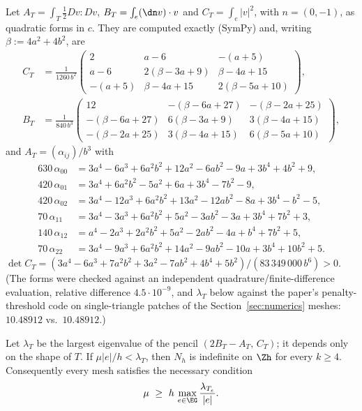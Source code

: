 Let $A_T=\int_T\frac12Dv:Dv$, $B_T=\int_e(\dn v)\cdot v$ and $C_T=\int_e|v|^2$, with $n=(0,-1)$, as quadratic forms in $c$. They are
computed exactly (SymPy) and, writing $\beta:=4a^2+4b^2$, are
\begin{align*}
C_T&=\frac1{1260\,b^2}\begin{pmatrix}2&a-6&-(a+5)\\ a-6&2(\beta-3a+9)&\beta-4a+15\\ -(a+5)&\beta-4a+15&2(\beta-5a+10)\end{pmatrix},\\
B_T&=\frac1{840\,b^3}\begin{pmatrix}12&-(\beta-6a+27)&-(\beta-2a+25)\\ -(\beta-6a+27)&6(\beta-3a+9)&3(\beta-4a+15)\\ -(\beta-2a+25)&3(\beta-4a+15)&6(\beta-5a+10)\end{pmatrix},
\end{align*}
and $A_T=(\alpha_{ij})/b^3$ with
\begin{align*}
630\,\alpha_{00}&=3a^4-6a^3+6a^2b^2+12a^2-6ab^2-9a+3b^4+4b^2+9,\\
420\,\alpha_{01}&=3a^4+6a^2b^2-5a^2+6a+3b^4-7b^2-9,\\
420\,\alpha_{02}&=3a^4-12a^3+6a^2b^2+13a^2-12ab^2-8a+3b^4-b^2-5,\\
70\,\alpha_{11}&=3a^4-3a^3+6a^2b^2+5a^2-3ab^2-3a+3b^4+7b^2+3,\\
140\,\alpha_{12}&=a^4-2a^3+2a^2b^2+5a^2-2ab^2-4a+b^4+7b^2+5,\\
70\,\alpha_{22}&=3a^4-9a^3+6a^2b^2+14a^2-9ab^2-10a+3b^4+10b^2+5 .
\end{align*}
$\det C_T=(3a^4-6a^3+7a^2b^2+3a^2-7ab^2+4b^4+5b^2)/(83\,349\,000\,b^6)>0$. (The forms were checked against an independent
quadrature/finite-difference evaluation, relative difference $4.5\cdot10^{-9}$, and $\lambda_T$ below against the paper's
penalty-threshold code on single-triangle patches of the Section~\ref{sec:numerics} meshes: $10.48912$ vs.\ $10.48912$.)

\begin{theorem}\label{pb:thm}
Let $\lambda_T$ be the largest eigenvalue of the pencil $(2B_T-A_T,\,C_T)$; it depends only on the shape of $T$. If
$\mu|e|/h<\lambda_T$, then $N_h$ is indefinite on $\Zh$ for every $k\ge4$. Consequently every mesh satisfies the necessary
condition
\[
\mu\ \ge\ h\,\max_{e\in\EG}\frac{\lambda_{T_e}}{|e|} .
\]
\end{theorem}

